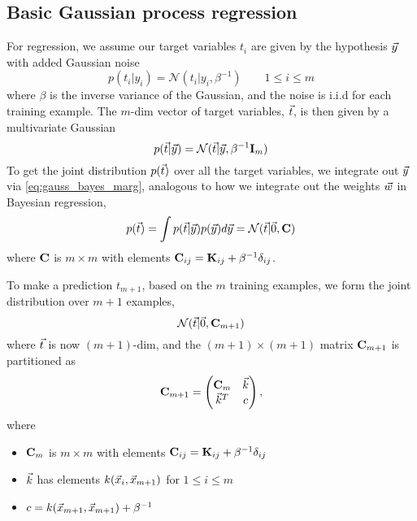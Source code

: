 \documentclass[11pt]{article}
\begin{document}
\subsection{Basic Gaussian process regression}
For regression, we assume our target variables $t_i$ are given by the hypothesis $\vec{y}$
with added Gaussian noise
\begin{equation}
  p(t_i | y_i) = \mathcal{N}(t_i | y_i, \beta^{-1}) \qquad 1 \leq i \leq m
\end{equation}
where $\beta$ is the inverse variance of the Gaussian, and the noise is i.i.d for each
training example. The $m$-dim vector of target variables, $\vec{t}$, is then given by a
multivariate Gaussian
\begin{equation}
  p(\vec{t} | \vec{y}) = \mathcal{N}(\vec{t} | \vec{y}, \beta^{-1} \mathbf{I}_m)
\end{equation}
To get the joint distribution $p(\vec{t})$ over all the target variables, we integrate out
$\vec{y}$ via \ref{eq:gauss_bayes_marg}, analogous to how we integrate out the weights
$\vec{w}$ in Bayesian regression,
\begin{equation}
  p(\vec{t}) = \int p(\vec{t} | \vec{y}) p(\vec{y}) d\vec{y} = \mathcal{N}(\vec{t} | \vec{0}, \mathbf{C})
\end{equation}
where $\mathbf{C}$ is $m \times m$ with elements
$\mathbf{C}_{ij} = \mathbf{K}_{ij} + \beta^{-1} \delta_{ij}$.

To make a prediction $t_{m+1}$, based on the $m$ training examples, we form the joint
distribution over $m+1$ examples,
\begin{equation}
  \mathcal{N}(\vec{t} | \vec{0}, \mathbf{C}_{m+1})
\end{equation}
where $\vec{t}$ is now $(m+1)$-dim, and the $(m+1) \times (m+1)$ matrix
$\mathbf{C}_{m+1}$ is partitioned as
\begin{equation}
  \mathbf{C}_{m+1} = 
  \left(
    \begin{matrix}
      \mathbf{C}_m & \vec{k}\\
      \vec{k}^T   & c
    \end{matrix}
  \right),
\end{equation}
where
\begin{itemize}
  \item $\mathbf{C}_m$ is $m \times m$ with elements
  $\mathbf{C}_{ij} = \mathbf{K}_{ij} + \beta^{-1} \delta_{ij}$
  \item $\vec{k}$ has elements $k(\vec{x}_i, \vec{x}_{m+1})$ for $1 \leq i \leq m$
  \item $c = k(\vec{x}_{m+1}, \vec{x}_{m+1}) + \beta^{-1}$
\end{itemize}
\end{document}
